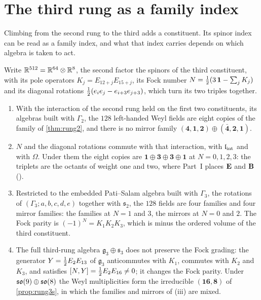 \section{The third rung as a family index}
\label{sec:families}

Climbing from the second rung to the third adds a constituent. Its spinor index can be read as a family index, and what that index carries
depends on which algebra is taken to act.

\begin{theorem}
\label{thm:families}
Write $\mathbb{R}^{512}=\mathbb{R}^{64}\otimes\mathbb{R}^8$, the second factor the spinors of the third constituent, with its pole operators
$K_j=E_{12+j}E_{15+j}$, its Fock number $N=\tfrac12(3\,\mathbf 1-\sum_jK_j)$ and its diagonal rotations $\tfrac12(e_ie_j-e_{i+3}e_{j+3})$, which turn its
two triples together.
\begin{enumerate}[label=(\roman*),leftmargin=2.2em,itemsep=1pt]
\item With the interaction of the second rung held on the first two constituents, its algebras built with $\Gamma_2$, the $128$
left-handed Weyl fields are eight copies of the family of \cref{thm:rung2}, and there is no mirror family
$(\mathbf4,\mathbf1,\mathbf2)\oplus(\bar{\mathbf4},\mathbf2,\mathbf1)$.
\item $N$ and the diagonal rotations commute with that interaction, with $\mathfrak l_{\rm int}$ and with $\Omega$. Under them the eight copies are
$\mathbf1\oplus\mathbf3\oplus\mathbf3\oplus\mathbf1$ at $N=0,1,2,3$: the triplets are the octants of weight one and two, where Part~I places
$\mathbf E$ and $\mathbf B$ ().
\item Restricted to the embedded Pati--Salam algebra built with $\Gamma_3$, the rotations of $(\Gamma_3;a,b,c,d,e)$ together with
$\mathfrak s_2$, the $128$ fields are four families and four mirror families: the families at $N=1$ and $3$, the mirrors at $N=0$ and $2$.
The Fock parity is $(-1)^N=K_1K_2K_3$, which is minus the ordered volume of the third constituent.
\item The full third-rung algebra $\mathfrak g_3\oplus\mathfrak s_3$ does not preserve the Fock grading: the generator $Y=\tfrac12 E_2E_{13}$ of
$\mathfrak g_3$ anticommutes with $K_1$, commutes with $K_2$ and $K_3$, and satisfies $[N,Y]=\tfrac12 E_2E_{16}\ne0$; it changes the Fock parity.
Under $\mathfrak{so}(9)\oplus\mathfrak{so}(8)$ the Weyl multiplicities form the irreducible $(\mathbf{16},\mathbf8)$ of \cref{prop:rung3s}, in which the families
and mirrors of (iii) are mixed.
\end{enumerate}
\end{theorem}

